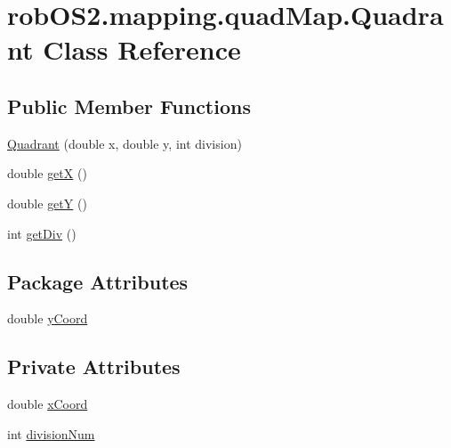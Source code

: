\hypertarget{classrob_o_s2_1_1mapping_1_1quad_map_1_1_quadrant}{
\section{robOS2.mapping.quadMap.Quadrant Class Reference}
\label{classrob_o_s2_1_1mapping_1_1quad_map_1_1_quadrant}
}
\subsection*{Public Member Functions}
\begin{DoxyCompactItemize}
\item 
\hyperlink{classrob_o_s2_1_1mapping_1_1quad_map_1_1_quadrant_a538819af96907e672376e219b7768f62}{Quadrant} (double x, double y, int division)
\item 
double \hyperlink{classrob_o_s2_1_1mapping_1_1quad_map_1_1_quadrant_a5bc8c87e11dada73a1398837d5302d53}{getX} ()
\item 
double \hyperlink{classrob_o_s2_1_1mapping_1_1quad_map_1_1_quadrant_a03e9d819ab49a7c2196f631014fdcc57}{getY} ()
\item 
int \hyperlink{classrob_o_s2_1_1mapping_1_1quad_map_1_1_quadrant_a3042a339886d8925d14f35c84404e2f5}{getDiv} ()
\end{DoxyCompactItemize}
\subsection*{Package Attributes}
\begin{DoxyCompactItemize}
\item 
double \hyperlink{classrob_o_s2_1_1mapping_1_1quad_map_1_1_quadrant_aa8eb1e2a9809842c04c93fd111db44d3}{yCoord}
\end{DoxyCompactItemize}
\subsection*{Private Attributes}
\begin{DoxyCompactItemize}
\item 
double \hyperlink{classrob_o_s2_1_1mapping_1_1quad_map_1_1_quadrant_a6ae260d1c505d262b0a6ce3a9807f8a3}{xCoord}
\item 
int \hyperlink{classrob_o_s2_1_1mapping_1_1quad_map_1_1_quadrant_aec915a37f3de7b2e0d4aa9463d516605}{divisionNum}
\end{DoxyCompactItemize}



